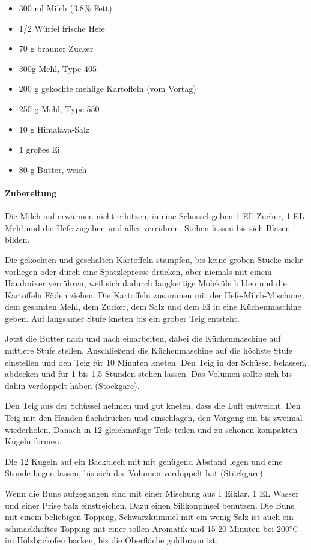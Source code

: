 \begin{itemize}[noitemsep]
	\item 300 ml Milch (3,8\% Fett)
	\item 1/2 Würfel frische Hefe
	\item 70 g brauner Zucker
	\item 300g Mehl, Type 405
	\item 200 g gekochte mehlige Kartoffeln (vom Vortag)
	\item 250 g Mehl, Type 550
	\item 10 g Himalaya-Salz
	\item 1 großes Ei
	\item 80 g Butter, weich
\end{itemize}

\paragraph{Zubereitung}

Die Milch auf erwärmen nicht erhitzen, in eine Schüssel geben 1 EL Zucker, 1 EL Mehl
und die Hefe zugeben und alles verrühren. Stehen lassen bis sich Blasen bilden. 

Die gekochten und geschälten Kartoffeln stampfen, bis keine groben 
Stücke mehr vorliegen oder durch eine Spätzlepresse drücken, aber niemals mit einem 
Handmixer verrühren, weil sich dadurch langkettige Moleküle bilden und die Kartoffeln
 Fäden ziehen. Die Kartoffeln zusammen mit der Hefe-Milch-Mischung, 
dem gesamten Mehl, dem Zucker, dem Salz und dem Ei in eine Küchenmaschine geben. 
Auf langsamer Stufe kneten bis ein grober Teig entsteht. 

Jetzt die Butter nach und nach einarbeiten, dabei die Küchenmaschine auf mittlere Stufe 
stellen. Anschließend die Küchenmaschine auf die höchste Stufe  einstellen und den 
Teig für 10 Minuten kneten. Den Teig in der Schüssel belassen, abdecken und für 1 bis 1,5
Stunden stehen lassen. Das Volumen sollte sich bis dahin verdoppelt haben (Stockgare).

Den Teig aus der Schüssel nehmen und gut kneten, dass die Luft entweicht. Den Teig 
mit den Händen flachdrücken und einschlagen, den Vorgang ein bis zweimal wiederholen.
Danach in 12 gleichmäßige Teile teilen und zu schönen kompakten Kugeln formen.

Die 12 Kugeln auf ein Backblech mit mit genügend Abstand legen und eine Stunde liegen
lassen, bis sich das Volumen verdoppelt hat (Stückgare).

Wenn die Buns aufgegangen sind mit einer Mischung aus 1 Eiklar, 1 EL Wasser und einer 
Prise Salz einstreichen. Dazu einen Silikonpinsel benutzen. Die Buns mit einem beliebigen
Topping, Schwarzkümmel mit ein wenig Salz ist auch ein schmackhaftes Topping mit einer
tollen Aromatik und 15-20 Minuten bei 200°C im Holzbackofen backen, bis die 
Oberfläche goldbraun ist.
